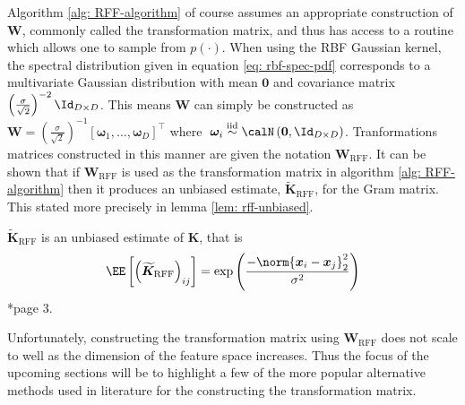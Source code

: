 Algorithm \ref{alg: RFF-algorithm} of course assumes an appropriate construction of $\bm{W}$, commonly called the transformation matrix, and thus has access to a routine which allows one to sample from $p(\cdot)$. When using the RBF Gaussian kernel, the spectral distribution given in equation \ref{eq: rbf-spec-pdf} corresponds to a multivariate Gaussian distribution with mean $\bm{0}$ and covariance matrix $\left( \frac{\sigma}{\sqrt{2}} \right)^{-2} \Id_{D \times D}$. This means $\bm{W}$ can simply be constructed as $\bm{W} = \left( \frac{\sigma}{\sqrt{2}} \right)^{-1} \left[ \bm{\omega}_1 ,\ldots , \bm{\omega}_D \right]^{\intercal}$ where $\; \bm{\omega}_i \stackrel{\text{iid}}{\sim} \calN \left( \bm{0} , \Id_{D \times D} \right)$. Tranformations matrices constructed in this manner are given the notation $\bm{W}_{\text{RFF}}$. It can be shown that if $\bm{W}_{\text{RFF}}$ is used as the transformation matrix in algorithm \ref{alg: RFF-algorithm} then it produces an unbiased estimate, $\bm{\widetilde{K}}_{\text{RFF}}$, for the Gram matrix. This stated more precisely in lemma \ref{lem: rff-unbiased}.

\begin{lem} \label{lem: rff-unbiased}
    $\bm{\widetilde{K}}_{\text{RFF}}$ is an unbiased estimate of $\bm{K}$, that is
    \[
        \EE \left[ \left( \bm{\widetilde{K}}_{\text{RFF}} \right)_{ij} \right] = \exp \left( \frac{- \norm{\bm{x}_i - {\bm{x}_j}}_{2}^{2}}{\sigma^2} \right)
    \] \cite{YuFelixX2016ORF}*{page 3}.
\end{lem}

Unfortunately, constructing the transformation matrix using $\bm{W}_{\text{RFF}}$ does not scale to well as the dimension of the feature space increases. Thus the focus of the upcoming sections will be to highlight a few of the more popular alternative methods used in literature for the constructing the transformation matrix.